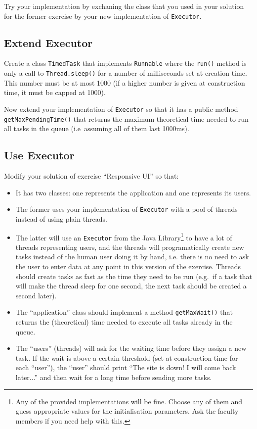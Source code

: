 \documentclass{article}
\begin{document}
Try your implementation by exchaning the class that you used in your
solution for the former exercise by your new implementation of
\verb+Executor+. 

\subsection{Extend Executor}
\label{sec:extending-executor}

Create a class \verb+TimedTask+ that implements
\verb+Runnable+ where the \verb+run()+ method is only a call to
\verb+Thread.sleep()+ for a number of milliseconds set at creation
time. This number must be at most 1000 (if a higher number is given at
construction time, it must be capped at 1000). 

Now extend your implementation of \verb+Executor+ so that it has a
public method \verb+getMaxPendingTime()+ that returns the maximum
theoretical time needed to run all tasks in the queue (i.e~assuming
all of them last 1000ms).


\subsection{Use Executor}
\label{sec:use-new-executor}

Modify your solution of exercise ``Responsive UI'' so that: 

\begin{itemize}
\item It has two classes: one represents the application and one
  represents its users.
\item The former uses your implementation of \verb+Executor+ with a
  pool of threads instead of using plain threads.
\item The latter will use an \verb+Executor+ from the Java
  Library\footnote{Any of the provided implementations will be
    fine. Choose any of them and guess appropriate values for the
    initialisation parameters. Ask the faculty members if you need
    help with this.} 
  to have a lot of
  threads representing users, and the threads will programatically
  create new tasks instead of the human user doing it by hand,
  i.e. there is no need to ask the user to enter data at any point in
  this version of the exercise. Threads should create tasks as
  fast as the time they need to be run (e.g.~if a task that will make
  the thread sleep for one second, the next task should be created
  a second later). 
\item The ``application'' class should implement a method
  \verb+getMaxWait()+ that returns the (theoretical) time needed to
  execute all tasks already in the queue.
\item The ``users'' (threads) will ask for the waiting time
  before they assign a new task. If the wait is above a certain
  threshold (set at construction time for each ``user''), the ``user'' 
  should print ``The site is down! I will come back later...'' and
  then wait for a long time before sending 
  more tasks. 
\end{itemize}
\end{document}
